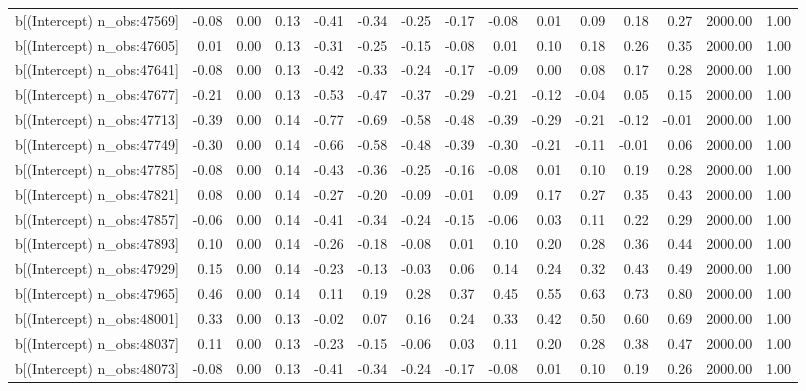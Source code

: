 \begin{table}[ht]
\begin{tabular}{rrrrrrrrrrrrrrr}
  b[(Intercept) n\_obs:47569] & -0.08 & 0.00 & 0.13 & -0.41 & -0.34 & -0.25 & -0.17 & -0.08 & 0.01 & 0.09 & 0.18 & 0.27 & 2000.00 & 1.00 \\ 
  b[(Intercept) n\_obs:47605] & 0.01 & 0.00 & 0.13 & -0.31 & -0.25 & -0.15 & -0.08 & 0.01 & 0.10 & 0.18 & 0.26 & 0.35 & 2000.00 & 1.00 \\ 
  b[(Intercept) n\_obs:47641] & -0.08 & 0.00 & 0.13 & -0.42 & -0.33 & -0.24 & -0.17 & -0.09 & 0.00 & 0.08 & 0.17 & 0.28 & 2000.00 & 1.00 \\ 
  b[(Intercept) n\_obs:47677] & -0.21 & 0.00 & 0.13 & -0.53 & -0.47 & -0.37 & -0.29 & -0.21 & -0.12 & -0.04 & 0.05 & 0.15 & 2000.00 & 1.00 \\ 
  b[(Intercept) n\_obs:47713] & -0.39 & 0.00 & 0.14 & -0.77 & -0.69 & -0.58 & -0.48 & -0.39 & -0.29 & -0.21 & -0.12 & -0.01 & 2000.00 & 1.00 \\ 
  b[(Intercept) n\_obs:47749] & -0.30 & 0.00 & 0.14 & -0.66 & -0.58 & -0.48 & -0.39 & -0.30 & -0.21 & -0.11 & -0.01 & 0.06 & 2000.00 & 1.00 \\ 
  b[(Intercept) n\_obs:47785] & -0.08 & 0.00 & 0.14 & -0.43 & -0.36 & -0.25 & -0.16 & -0.08 & 0.01 & 0.10 & 0.19 & 0.28 & 2000.00 & 1.00 \\ 
  b[(Intercept) n\_obs:47821] & 0.08 & 0.00 & 0.14 & -0.27 & -0.20 & -0.09 & -0.01 & 0.09 & 0.17 & 0.27 & 0.35 & 0.43 & 2000.00 & 1.00 \\ 
  b[(Intercept) n\_obs:47857] & -0.06 & 0.00 & 0.14 & -0.41 & -0.34 & -0.24 & -0.15 & -0.06 & 0.03 & 0.11 & 0.22 & 0.29 & 2000.00 & 1.00 \\ 
  b[(Intercept) n\_obs:47893] & 0.10 & 0.00 & 0.14 & -0.26 & -0.18 & -0.08 & 0.01 & 0.10 & 0.20 & 0.28 & 0.36 & 0.44 & 2000.00 & 1.00 \\ 
  b[(Intercept) n\_obs:47929] & 0.15 & 0.00 & 0.14 & -0.23 & -0.13 & -0.03 & 0.06 & 0.14 & 0.24 & 0.32 & 0.43 & 0.49 & 2000.00 & 1.00 \\ 
  b[(Intercept) n\_obs:47965] & 0.46 & 0.00 & 0.14 & 0.11 & 0.19 & 0.28 & 0.37 & 0.45 & 0.55 & 0.63 & 0.73 & 0.80 & 2000.00 & 1.00 \\ 
  b[(Intercept) n\_obs:48001] & 0.33 & 0.00 & 0.13 & -0.02 & 0.07 & 0.16 & 0.24 & 0.33 & 0.42 & 0.50 & 0.60 & 0.69 & 2000.00 & 1.00 \\ 
  b[(Intercept) n\_obs:48037] & 0.11 & 0.00 & 0.13 & -0.23 & -0.15 & -0.06 & 0.03 & 0.11 & 0.20 & 0.28 & 0.38 & 0.47 & 2000.00 & 1.00 \\ 
  b[(Intercept) n\_obs:48073] & -0.08 & 0.00 & 0.13 & -0.41 & -0.34 & -0.24 & -0.17 & -0.08 & 0.01 & 0.10 & 0.19 & 0.26 & 2000.00 & 1.00 \\ 

\end{tabular}
\end{table}
